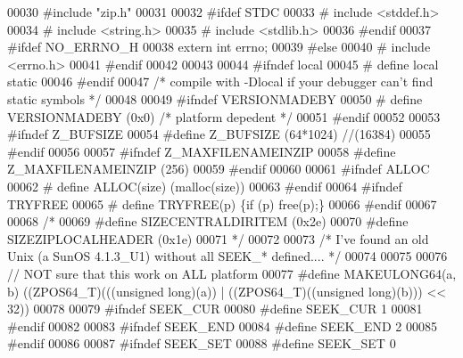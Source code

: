 \begin{DoxyCode}
00030 \textcolor{preprocessor}{#include "zip.h"}
00031 
00032 \textcolor{preprocessor}{#ifdef STDC}
00033 \textcolor{preprocessor}{#  include <stddef.h>}
00034 \textcolor{preprocessor}{#  include <string.h>}
00035 \textcolor{preprocessor}{#  include <stdlib.h>}
00036 \textcolor{preprocessor}{#endif}
00037 \textcolor{preprocessor}{#ifdef NO\_ERRNO\_H}
00038     \textcolor{keyword}{extern} \textcolor{keywordtype}{int} errno;
00039 \textcolor{preprocessor}{#else}
00040 \textcolor{preprocessor}{#   include <errno.h>}
00041 \textcolor{preprocessor}{#endif}
00042 
00043 
00044 \textcolor{preprocessor}{#ifndef local}
00045 \textcolor{preprocessor}{#  define local static}
00046 \textcolor{preprocessor}{#endif}
00047 \textcolor{comment}{/* compile with -Dlocal if your debugger can't find static symbols */}
00048 
00049 \textcolor{preprocessor}{#ifndef VERSIONMADEBY}
00050 \textcolor{preprocessor}{# define VERSIONMADEBY   (0x0) }\textcolor{comment}{/* platform depedent */}\textcolor{preprocessor}{}
00051 \textcolor{preprocessor}{#endif}
00052 
00053 \textcolor{preprocessor}{#ifndef Z\_BUFSIZE}
00054 \textcolor{preprocessor}{#define Z\_BUFSIZE (64*1024) //(16384)}
00055 \textcolor{preprocessor}{#endif}
00056 
00057 \textcolor{preprocessor}{#ifndef Z\_MAXFILENAMEINZIP}
00058 \textcolor{preprocessor}{#define Z\_MAXFILENAMEINZIP (256)}
00059 \textcolor{preprocessor}{#endif}
00060 
00061 \textcolor{preprocessor}{#ifndef ALLOC}
00062 \textcolor{preprocessor}{# define ALLOC(size) (malloc(size))}
00063 \textcolor{preprocessor}{#endif}
00064 \textcolor{preprocessor}{#ifndef TRYFREE}
00065 \textcolor{preprocessor}{# define TRYFREE(p) \{if (p) free(p);\}}
00066 \textcolor{preprocessor}{#endif}
00067 
00068 \textcolor{comment}{/*}
00069 \textcolor{comment}{#define SIZECENTRALDIRITEM (0x2e)}
00070 \textcolor{comment}{#define SIZEZIPLOCALHEADER (0x1e)}
00071 \textcolor{comment}{*/}
00072 
00073 \textcolor{comment}{/* I've found an old Unix (a SunOS 4.1.3\_U1) without all SEEK\_* defined.... */}
00074 
00075 
00076 \textcolor{comment}{// NOT sure that this work on ALL platform}
00077 \textcolor{preprocessor}{#define MAKEULONG64(a, b) ((ZPOS64\_T)(((unsigned long)(a)) | ((ZPOS64\_T)((unsigned long)(b))) << 32))}
00078 
00079 \textcolor{preprocessor}{#ifndef SEEK\_CUR}
00080 \textcolor{preprocessor}{#define SEEK\_CUR    1}
00081 \textcolor{preprocessor}{#endif}
00082 
00083 \textcolor{preprocessor}{#ifndef SEEK\_END}
00084 \textcolor{preprocessor}{#define SEEK\_END    2}
00085 \textcolor{preprocessor}{#endif}
00086 
00087 \textcolor{preprocessor}{#ifndef SEEK\_SET}
00088 \textcolor{preprocessor}{#define SEEK\_SET    0}

\end{DoxyCode}

